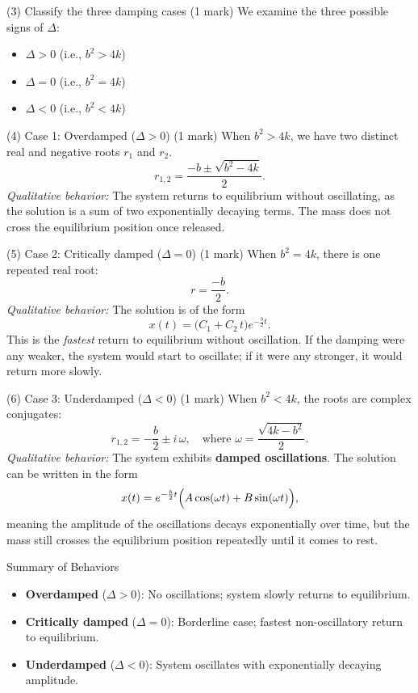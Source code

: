 \documentclass{article}
\begin{document}
(3) Classify the three damping cases (1 mark)
We examine the three possible signs of \(\Delta\):

\begin{itemize}
\item \(\Delta > 0\) (i.e., \(b^2 > 4k\)) 
\item \(\Delta = 0\) (i.e., \(b^2 = 4k\))
\item \(\Delta < 0\) (i.e., \(b^2 < 4k\))
\end{itemize}

(4) Case 1: Overdamped (\(\Delta > 0\)) (1 mark)
When \(b^2 > 4k\), we have two distinct real and negative roots \(r_1\) and \(r_2\). 
\[
r_{1,2} = \frac{-b \pm \sqrt{b^2 - 4k}}{2}.
\]
\emph{Qualitative behavior:} The system returns to equilibrium without oscillating, as the solution is a sum of two exponentially decaying terms. The mass does not cross the equilibrium position once released.

(5) Case 2: Critically damped (\(\Delta = 0\)) (1 mark)
When \(b^2 = 4k\), there is one repeated real root:
\[
r = \frac{-b}{2}.
\]
\emph{Qualitative behavior:} The solution is of the form
\[
x(t) = \bigl(C_1 + C_2\,t \bigr)e^{-\frac{b}{2}t}.
\]
This is the \emph{fastest} return to equilibrium without oscillation. If the damping were any weaker, the system would start to oscillate; if it were any stronger, it would return more slowly.

(6) Case 3: Underdamped (\(\Delta < 0\)) (1 mark)
When \(b^2 < 4k\), the roots are complex conjugates:
\[
r_{1,2} = -\frac{b}{2} \pm i\,\omega, 
\quad \text{where } \omega = \frac{\sqrt{4k - b^2}}{2}.
\]
\emph{Qualitative behavior:} The system exhibits \textbf{damped oscillations}. The solution can be written in the form
\[
x(t) = e^{-\frac{b}{2}t} \Bigl(A\cos(\omega t) + B\sin(\omega t)\Bigr),
\]
meaning the amplitude of the oscillations decays exponentially over time, but the mass still crosses the equilibrium position repeatedly until it comes to rest.

Summary of Behaviors
\begin{itemize}
\item \textbf{Overdamped} (\(\Delta > 0\)): No oscillations; system slowly returns to equilibrium.
\item \textbf{Critically damped} (\(\Delta = 0\)): Borderline case; fastest non-oscillatory return to equilibrium.
\item \textbf{Underdamped} (\(\Delta < 0\)): System oscillates with exponentially decaying amplitude.
\end{itemize}
\end{document}
